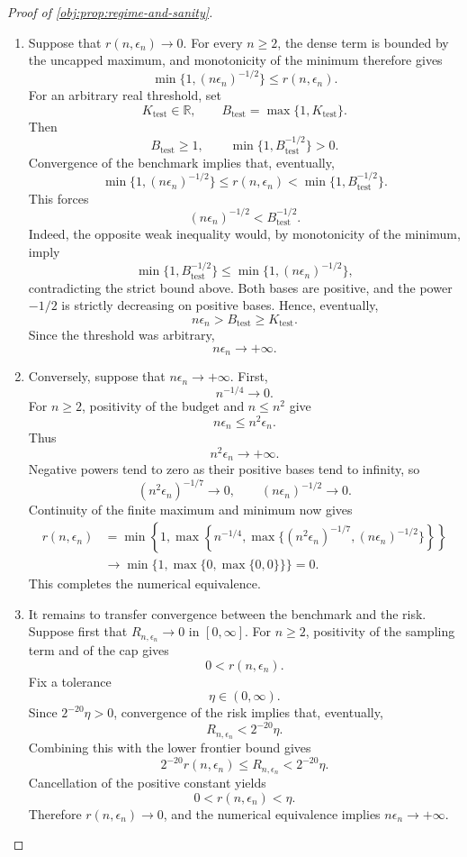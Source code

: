 \begin{proof}[Proof of \cref{obj:prop:regime-and-sanity}]
\begin{enumerate}
\item Suppose that \(r(n,\epsilon_n)\to0\).
For every \(n\ge2\), the dense term is bounded by the uncapped maximum, and monotonicity of the minimum therefore gives
\[
\min\{1,(n\epsilon_n)^{-1/2}\}
\le r(n,\epsilon_n).
\]
For an arbitrary real threshold, set
\[
K_{\mathrm{test}}\in\mathbb R,
\qquad
B_{\mathrm{test}}=\max\{1,K_{\mathrm{test}}\}.
\]
Then
\[
B_{\mathrm{test}}\ge1,
\qquad
\min\{1,B_{\mathrm{test}}^{-1/2}\}>0.
\]
Convergence of the benchmark implies that, eventually,
\[
\min\{1,(n\epsilon_n)^{-1/2}\}
\le r(n,\epsilon_n)
<\min\{1,B_{\mathrm{test}}^{-1/2}\}.
\]
This forces
\[
(n\epsilon_n)^{-1/2}<B_{\mathrm{test}}^{-1/2}.
\]
Indeed, the opposite weak inequality would, by monotonicity of the minimum, imply
\[
\min\{1,B_{\mathrm{test}}^{-1/2}\}
\le\min\{1,(n\epsilon_n)^{-1/2}\},
\]
contradicting the strict bound above.
Both bases are positive, and the power \(-1/2\) is strictly decreasing on positive bases. Hence, eventually,
\[
n\epsilon_n>B_{\mathrm{test}}\ge K_{\mathrm{test}}.
\]
Since the threshold was arbitrary,
\[
n\epsilon_n\longrightarrow+\infty.
\]

\item Conversely, suppose that \(n\epsilon_n\to+\infty\).
First,
\[
n^{-1/4}\longrightarrow0.
\]
For \(n\ge2\), positivity of the budget and \(n\le n^2\) give
\[
n\epsilon_n\le n^2\epsilon_n.
\]
Thus
\[
n^2\epsilon_n\longrightarrow+\infty.
\]
Negative powers tend to zero as their positive bases tend to infinity, so
\[
(n^2\epsilon_n)^{-1/7}\longrightarrow0,
\qquad
(n\epsilon_n)^{-1/2}\longrightarrow0.
\]
Continuity of the finite maximum and minimum now gives
\[
\begin{aligned}
r(n,\epsilon_n)
&=\min\left\{1,\max\left\{
n^{-1/4},
\max\{(n^2\epsilon_n)^{-1/7},(n\epsilon_n)^{-1/2}\}
\right\}\right\}\\
&\longrightarrow
\min\{1,\max\{0,\max\{0,0\}\}\}=0.
\end{aligned}
\]
This completes the numerical equivalence.

\item It remains to transfer convergence between the benchmark and the risk.
Suppose first that \(R_{n,\epsilon_n}\to0\) in \([0,\infty]\).
For \(n\ge2\), positivity of the sampling term and of the cap gives
\[
0<r(n,\epsilon_n).
\]
Fix a tolerance
\[
\eta\in(0,\infty).
\]
Since \(2^{-20}\eta>0\), convergence of the risk implies that, eventually,
\[
R_{n,\epsilon_n}<2^{-20}\eta.
\]
Combining this with the lower frontier bound gives
\[
2^{-20}r(n,\epsilon_n)
\le R_{n,\epsilon_n}
<2^{-20}\eta.
\]
Cancellation of the positive constant yields
\[
0<r(n,\epsilon_n)<\eta.
\]
Therefore \(r(n,\epsilon_n)\to0\), and the numerical equivalence implies
\(n\epsilon_n\to+\infty\).


\end{enumerate}
\end{proof}
